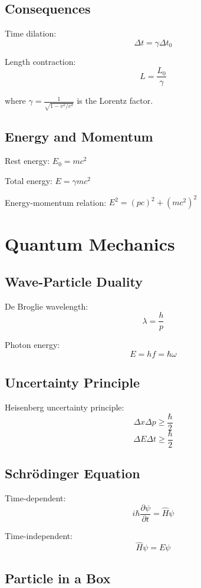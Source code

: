 \documentclass[11pt]{book}
\begin{document}
\subsection{Consequences}

Time dilation:
\[ \Delta t = \gamma \Delta t_0 \]

Length contraction:
\[ L = \frac{L_0}{\gamma} \]

where $\gamma = \frac{1}{\sqrt{1-v^2/c^2}}$ is the Lorentz factor.

\subsection{Energy and Momentum}

Rest energy: $E_0 = mc^2$

Total energy: $E = \gamma mc^2$

Energy-momentum relation: $E^2 = (pc)^2 + (mc^2)^2$

\section{Quantum Mechanics}

\subsection{Wave-Particle Duality}

De Broglie wavelength:
\[ \lambda = \frac{h}{p} \]

Photon energy:
\[ E = hf = \hbar\omega \]

\subsection{Uncertainty Principle}

Heisenberg uncertainty principle:
\[ \Delta x \Delta p \geq \frac{\hbar}{2} \]
\[ \Delta E \Delta t \geq \frac{\hbar}{2} \]

\subsection{Schrödinger Equation}

Time-dependent:
\[ i\hbar \frac{\partial \psi}{\partial t} = \hat{H}\psi \]

Time-independent:
\[ \hat{H}\psi = E\psi \]

\subsection{Particle in a Box}
\end{document}
